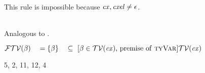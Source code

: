 \begin{bycase}

\Case{\Rcxmt}\\
This rule is impossible because $\mathit{cx},\mathit{cxel}\neq\epsilon$.

\Case{\Rcxtdec, \Rcxtvdec}
\StePO{\ftvar{\cxel}=\emptyset\subseteq\cxtvarO}

\Case{\Rcxodec}
\begin{derivation}
\step{\isty{\snoc{\cx}{\tvdec{\tvarS}}}{\typ}}{\premof{\Rcxodec}}
\end{derivation}

\Case{\Rcxtdef, \Rcxax, \Rcxlem}\\
Analogous to \Rcxodec.

\Case{\Rcxvdec}
\begin{derivation}
\step{\istyO{\typ}}{\premof{\Rcxvdec}}
\end{derivation}

\Case{\Rtbool}
\StePO{\ftvar{\bool}=\emptyset\subseteq\cxtvarO}

\Case{\Rtvar}
\begin{links}
$\mathcal{FTV}(\beta)
 \\\hspace*{1em}=\\
 \{\beta\}
 \\\hspace*{1em}\subseteq\ [\mbox{$\beta\in\mathcal{TV}(\mathit{cx})$, premise of \textsc{tyVar}}]\\
 \mathcal{TV}(\mathit{cx})$
\end{links}

\Case{\Rtinst}
\begin{derivation}
\end{derivation}

\Case{\Rtedef}
\begin{derivation}
     {}
\step{\tdefO\in\cx}{\premof{\Rtedef}}
\step{\cxwf{\cx}}{\premof{\Rtedef}}
\step{\ftvar{\tinstO}\cup\ftvar{\tsbslash{\typ}{\tvarS}{\typS}}
      \subseteq\cxtvarO}
     {5, 2, 11, 12, 4}
\end{derivation}


\end{bycase}
